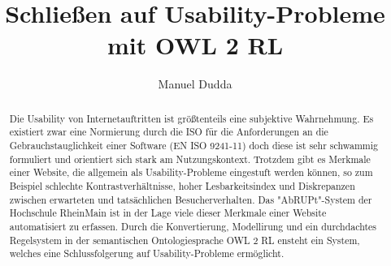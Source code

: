 \documentclass[runningheads,a4paper]{llncs}
\begin{document}
\mainmatter  %

\title{Schließen auf Usability-Probleme mit OWL 2 RL}


%
%
\author{Manuel Dudda}
%


%
%

\maketitle


\begin{abstract}
Die Usability von Internetauftritten ist größtenteils eine subjektive Wahrnehmung. Es existiert zwar eine Normierung durch die ISO für die Anforderungen an die Gebrauchstauglichkeit einer Software (EN ISO 9241-11) doch diese ist sehr schwammig formuliert und orientiert sich stark am Nutzungskontext. Trotzdem gibt es Merkmale einer Website, die allgemein als Usability-Probleme eingestuft werden können, so zum Beispiel schlechte Kontrastverhältnisse, hoher Lesbarkeitsindex und Diskrepanzen zwischen erwarteten und tatsächlichen Besucherverhalten. Das "AbRUPt"-System der Hochschule RheinMain ist in der Lage viele dieser Merkmale einer Website automatisiert zu erfassen. Durch die Konvertierung, Modellirung und ein durchdachtes Regelsystem in der semantischen Ontologiesprache OWL 2 RL ensteht ein System, welches eine Schlussfolgerung auf Usability-Probleme ermöglicht.
\end{abstract}
\end{document}
